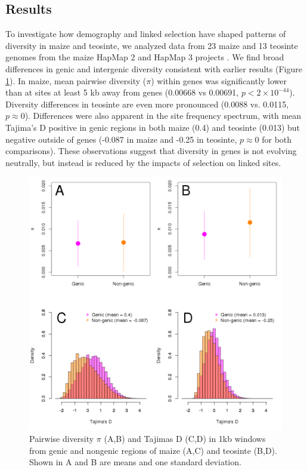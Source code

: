 \documentclass{pnastwo}
\begin{document}
\begin{article}
\section{Results}
To investigate how demography and linked selection have shaped patterns of diversity in maize and teosinte, we analyzed data from 23 maize and 13 teosinte genomes from the maize HapMap 2 and HapMap 3 projects \cite{chia2012, hapmap3}.
We find broad differences in genic and intergenic diversity consistent with earlier results  \cite{hufford2012}(Figure \ref{fig:diversity}).  In maize, mean pairwise diversity ($\pi$) within genes was significantly lower than at sites at least 5 kb away from genes (0.00668 vs 0.00691, $p<2\times 10^{-44}$). 
Diversity differences in teosinte are even more pronounced (0.0088 vs. 0.0115, $p\approx 0$). 
Differences were also apparent in the site frequency spectrum, with mean Tajima's D positive in genic regions in both maize (0.4) and teosinte (0.013) but negative outside of genes (-0.087 in maize and -0.25 in teosinte, $p\approx 0$ for both comparisons).
These observations suggest that diversity in genes is not evolving neutrally, but instead is reduced by the impacts of selection on linked sites. 

\begin{figure}
\begin{center}
  \includegraphics[width=.45\textwidth] {FigsAndFiles/Pi_and_Tajima.png}
\end{center}
\caption{Pairwise diversity $\pi$ (A,B) and Tajimas D (C,D) in 1kb windows from genic and nongenic regions of maize (A,C) and teosinte (B,D). Shown in A and B are means and one standard deviation.   \label{fig:diversity} }
\end{figure}


\end{article}
\end{document}
